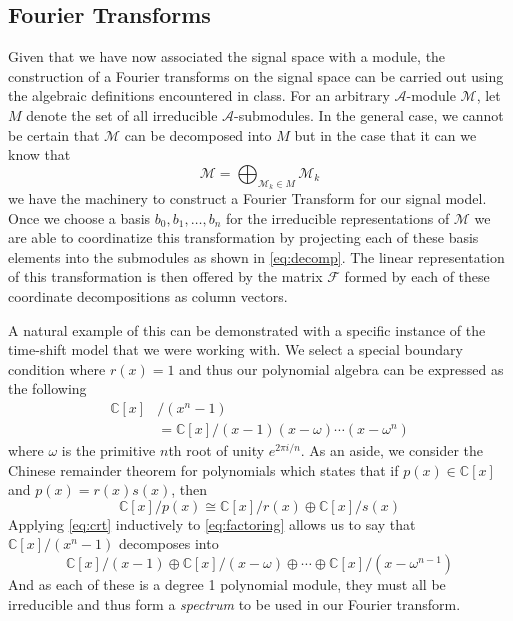 \documentclass[12pt,technote]{IEEEtran}
\begin{document}
\subsection{Fourier Transforms}
Given that we have now associated the signal space with a module, the construction of a Fourier transforms on the signal space can be carried out using the algebraic definitions encountered in class. For an arbitrary $\mathcal{A}$-module $\mathcal{M}$, let $M$ denote the set of all irreducible $\mathcal{A}$-submodules. In the general case, we cannot be certain that $\mathcal{M}$ can be decomposed into $M$ but in the case that it can we know that
\begin{equation}
    \mathcal{M} = \bigoplus_{\mathcal{M}_k\in M}\mathcal{M}_k\label{eq:decomp}
\end{equation}
we have the machinery to construct a Fourier Transform for our signal model. Once we choose a basis $b_0, b_1, \dots, b_n$ for the irreducible representations of $\mathcal{M}$ we are able to coordinatize this transformation by projecting each of these basis elements into the submodules as shown in \eqref{eq:decomp}. The linear representation of this transformation is then offered by the matrix $\mathcal{F}$ formed by each of these coordinate decompositions as column vectors.

A natural example of this can be demonstrated with a specific instance of the time-shift model that we were working with. We select a special boundary condition where $r(x) = 1$ and thus our polynomial algebra can be expressed as the following
\begin{align}
    \mathbb{C}[x]&/(x^{n}-1) \nonumber\\
    &= \mathbb{C}[x]/(x - 1)(x-\omega)\cdots(x-\omega^{n})\label{eq:factoring}
\end{align}
where $\omega$ is the primitive $n$th root of unity $e^{2\pi i/n}$. As an aside, we consider the Chinese remainder theorem for polynomials which states that if $p(x)\in \mathbb{C}[x]$ and $p(x) = r(x)s(x)$, then
\begin{equation}
    \mathbb{C}[x]/p(x)\cong\mathbb{C}[x]/r(x)\oplus\mathbb{C}[x]/s(x)\label{eq:crt}
\end{equation}
Applying \eqref{eq:crt} inductively to \eqref{eq:factoring} allows us to say that $\mathbb{C}[x]/(x^n-1)$ decomposes into
\begin{equation*}
    \mathbb{C}[x]/(x-1)\oplus\mathbb{C}[x]/(x-\omega)\oplus\cdots \oplus\mathbb{C}[x]/(x-\omega^{n-1})
\end{equation*}
And as each of these is a degree 1 polynomial module, they must all be irreducible and thus form a \textit{spectrum} to be used in our Fourier transform.
\end{document}
